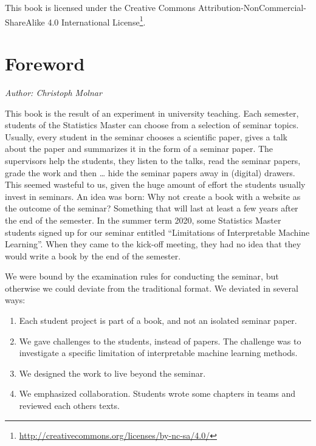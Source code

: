 \documentclass[]{krantz}
\providecommand{\tightlist}{%
  \setlength{\itemsep}{0pt}\setlength{\parskip}{0pt}}
\renewcommand{\href}[2]{#2\footnote{\url{#1}}}
\begin{document}
This book is licensed under the \href{http://creativecommons.org/licenses/by-nc-sa/4.0/}{Creative Commons Attribution-NonCommercial-ShareAlike 4.0 International License}.

\mainmatter

\hypertarget{foreword}{%
\chapter*{Foreword}\label{foreword}}


\emph{Author: Christoph Molnar}

This book is the result of an experiment in university teaching.
Each semester, students of the Statistics Master can choose from a selection of seminar topics.
Usually, every student in the seminar chooses a scientific paper, gives a talk about the paper and summarizes it in the form of a seminar paper.
The supervisors help the students, they listen to the talks, read the seminar papers, grade the work and then \ldots{} hide the seminar papers away in (digital) drawers.
This seemed wasteful to us, given the huge amount of effort the students usually invest in seminars.
An idea was born:
Why not create a book with a website as the outcome of the seminar?
Something that will last at least a few years after the end of the semester.
In the summer term 2020, some Statistics Master students signed up for our seminar entitled ``Limitations of Interpretable Machine Learning''.
When they came to the kick-off meeting, they had no idea that they would write a book by the end of the semester.

We were bound by the examination rules for conducting the seminar, but otherwise we could deviate from the traditional format.
We deviated in several ways:

\begin{enumerate}
\def\labelenumi{\arabic{enumi}.}
\tightlist
\item
  Each student project is part of a book, and not an isolated seminar paper.
\item
  We gave challenges to the students, instead of papers. The challenge was to investigate a specific limitation of interpretable machine learning methods.
\item
  We designed the work to live beyond the seminar.
\item
  We emphasized collaboration. Students wrote some chapters in teams and reviewed each others texts.
\end{enumerate}
\end{document}
